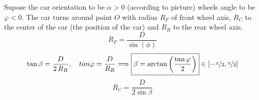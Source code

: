\documentclass[a4paper]{article}
\begin{document}
\begin{floatingfigure}{0.4\textwidth}
\end{floatingfigure}

	Supose the car orientation to be $\alpha >0$ (according to picture) wheels angle to be $\varphi < 0$. The car turns around point $O$ with radius $R_F$ of front wheel axis, $R_C$ to the center of the car (the position of the car) and $R_R$ to the rear wheel axis.
	\[
		\boxed{R_F = \frac{D}{\sin(\phi)}}
	\]
	\[
		\tan\beta = \frac{D}{2\,R_R},\quad tan\varphi = \frac{D}{R_R} \Longrightarrow
		\boxed{\beta = \arctan\left(\frac{\tan\varphi}{2}\right)} \in [-\nicefrac\pi2,\nicefrac\pi 2]
	\]
	\[
	\boxed{R_C = \frac{D}{2\sin\beta}}
	\]
\end{document}
